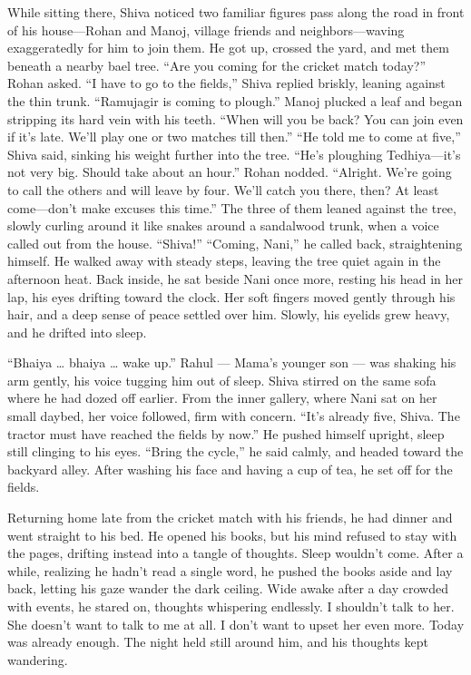 While sitting there, Shiva noticed two familiar figures pass along the road in front of his house—Rohan and Manoj, village friends and neighbors—waving exaggeratedly for him to join them. He got up, crossed the yard, and met them beneath a nearby bael tree. ``Are you coming for the cricket match today?'' Rohan asked. ``I have to go to the fields,'' Shiva replied briskly, leaning against the thin trunk. ``Ramujagir is coming to plough.'' Manoj plucked a leaf and began stripping its hard vein with his teeth. ``When will you be back? You can join even if it's late. We'll play one or two matches till then.'' ``He told me to come at five,'' Shiva said, sinking his weight further into the tree. ``He's ploughing Tedhiya—it's not very big. Should take about an hour.'' Rohan nodded. ``Alright. We're going to call the others and will leave by four. We'll catch you there, then? At least come—don't make excuses this time.'' The three of them leaned against the tree, slowly curling around it like snakes around a sandalwood trunk, when a voice called out from the house. ``Shiva!'' ``Coming, Nani,'' he called back, straightening himself. He walked away with steady steps, leaving the tree quiet again in the afternoon heat. Back inside, he sat beside Nani once more, resting his head in her lap, his eyes drifting toward the clock. Her soft fingers moved gently through his hair, and a deep sense of peace settled over him. Slowly, his eyelids grew heavy, and he drifted into sleep.

``Bhaiya … bhaiya … wake up.'' Rahul — Mama's younger son — was shaking his arm gently, his voice tugging him out of sleep. Shiva stirred on the same sofa where he had dozed off earlier. From the inner gallery, where Nani sat on her small daybed, her voice followed, firm with concern. ``It's already five, Shiva. The tractor must have reached the fields by now.'' He pushed himself upright, sleep still clinging to his eyes. ``Bring the cycle,'' he said calmly, and headed toward the backyard alley. After washing his face and having a cup of tea, he set off for the fields.

Returning home late from the cricket match with his friends, he had dinner and went straight to his bed. He opened his books, but his mind refused to stay with the pages, drifting instead into a tangle of thoughts. Sleep wouldn't come. After a while, realizing he hadn't read a single word, he pushed the books aside and lay back, letting his gaze wander the dark ceiling. Wide awake after a day crowded with events, he stared on, thoughts whispering endlessly. I shouldn't talk to her. She doesn't want to talk to me at all. I don't want to upset her even more. Today was already enough. The night held still around him, and his thoughts kept wandering.